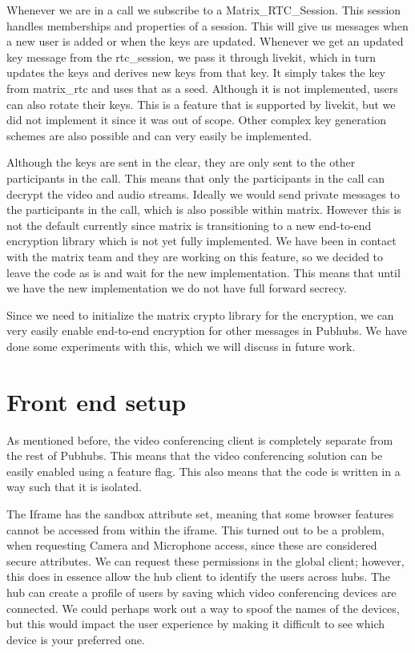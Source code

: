 \documentclass{report}
\begin{document}
Whenever we are in a call we subscribe to a Matrix\_RTC\_Session. This session handles memberships and
properties of a session. This will give us messages when a new user is added or when the keys are updated.
Whenever we get an updated key message from the rtc\_session, we pass it through livekit, which in turn updates
the keys and derives new keys from that key. It simply takes the key from matrix\_rtc and uses
that as a seed. Although it is not implemented, users can also rotate their keys. This is a feature that is
supported by livekit, but we did not implement it since it was out of scope. Other complex key generation schemes
are also possible and can very easily be implemented.

Although the keys are sent in the clear, they are only sent to the other participants in the call. This means that
only the participants in the call can decrypt the video and audio streams. Ideally we would send private
messages to the participants in the call, which is also possible within matrix. However this is not the default
currently since matrix is transitioning to a new end-to-end encryption library which is not yet fully implemented.
We have been in contact with the matrix team and they are working on this feature, so we decided to leave the code
as is and wait for the new implementation. This means that until we have the new implementation we do not have
full forward secrecy.

Since we need to initialize the matrix crypto library for the encryption, we can very easily enable end-to-end
encryption for other messages in Pubhubs. We have done some experiments with this, which we will discuss in future
work.


\section{Front end setup}
As mentioned before, the video conferencing client is completely separate from the rest of Pubhubs. This means that
the video conferencing solution can be easily enabled using a feature flag. This also means that the code is
written in a way such that it is isolated.

The Iframe has the sandbox attribute set, meaning that some browser features cannot be accessed from within the
iframe. This turned out to be a problem, when requesting Camera and Microphone access, since these are considered
secure attributes. We can request these permissions in the global client; however, this does in essence allow the
hub client to identify the users across hubs. The hub can create a profile of users by saving which video
conferencing devices are connected. We could perhaps work out a way to spoof the names of the devices, but this
would impact the user experience by making it difficult to see which device is your preferred one.
\end{document}
